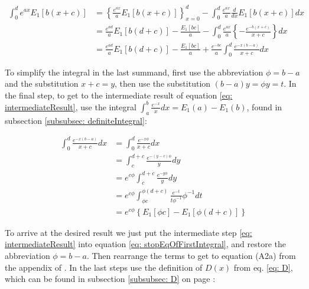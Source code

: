 \documentclass[bibliography=totocnumbered]{scrartcl}
\begin{document}
	\begin{align}
		\int_{0}^{d}e^{ax}E_1\left[b\left(x+c\right)\right]&=\left\{\frac{e^{ax}}{a}E_1\left[b\left(x+c\right)\right]\right\}_{x=0}^d-\int_{0}^{d}\frac{e^{ax}}{a}\frac{d}{dx}E_1\left[b\left(x+c\right)\right]dx\\
		&=\frac{e^{ad}}{a}E_1\left[b\left(d+c\right)\right]-\frac{E_1\left[bc\right]}{a}-\int_{0}^{d}\frac{e^{ax}}{a}\left\{-\frac{e^{-b\left(x+c\right)}}{x+c}\right\}dx\\
		&=\frac{e^{ad}}{a}E_1\left[b\left(d+c\right)\right]-\frac{E_1\left[bc\right]}{a}+\frac{e^{-bc}}{a}\int_{0}^{d}\frac{e^{-x\left(b-a\right)}}{x+c}dx\label{eq: stopEqOfFirstIntegral}
	\end{align}

	To simplify the integral in the last summand, first use the abbreviation $\phi=b-a$ and the substitution $x+c=y$, then use the substitution $\left(b-a\right)y=\phi{}y=t$. In the final step, to get to the intermediate result of equation \eqref{eq: intermediateResult}, use the integral $\int_{a}^{b}\frac{e^{-x}}{x}dx=E_1\left(a\right)-E_1\left(b\right)$, found in subsection  \ref{subsubsec: definiteIntegral}:

	\begin{align}
		\int_{0}^{d}\frac{e^{-x\left(b-a\right)}}{x+c}dx&=\int_{0}^{d}\frac{e^{-x\phi}}{x+c}dx\\
		&=\int_{c}^{d+c}\frac{e^{-\left(y-c\right)\phi}}{y}dy\\
		&=e^{c\phi}\int_{c}^{d+c}\frac{e^{-y\phi}}{y}dy\\
		&=e^{c\phi}\int_{\phi{}c}^{\phi\left(d+c\right)}\frac{e^{-t}}{t\phi^{-1}}\phi^{-1}dt\\
		&=e^{c\phi}\left\{E_1\left[\phi{}c\right]-E_1\left[\phi\left(d+c\right)\right]\right\}\label{eq: intermediateResult}
	\end{align}

	To arrive at the desired result we just put the intermediate step \eqref{eq: intermediateResult} into equation \eqref{eq: stopEqOfFirstIntegral}, and restore the abbreviation $\phi=b-a$. Then rearrange the terms to get to equation (A2a) from the appendix of \cite{boer1990calc}. In the last steps use the definition of $D\left(x\right)$ from eq. \eqref{eq: D}, which can be found in subsection \ref{subsubsec: D} on page \pageref{subsubsec: D}:
\end{document}
